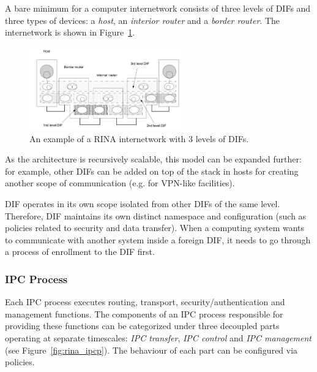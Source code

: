                 A bare minimum for a computer internetwork consists of three levels of DIFs and three types of devices: a \emph{host}, an \emph{interior router} and a \emph{border router}. The internetwork is shown in Figure~\ref{fig:rina_internetwork}.

                \begin{figure}[H]
                    \begin{center}
                        \includegraphics[width=0.6\textwidth]{fig/archs_rina-net.png}
                      \caption{An example of a RINA internetwork with 3 levels of DIFs.}
                      \label{fig:rina_internetwork}
                    \end{center}
                \end{figure}

                As the architecture is recursively scalable, this model can be expanded further: for example, other DIFs can be added on top of the stack in hosts for creating another scope of communication (e.g. for VPN-like facilities).

                DIF operates in its own scope isolated from other DIFs of the same level. Therefore, DIF maintains its own distinct namespace and configuration (such as policies related to security and data transfer). When a computing system wants to communicate with another system inside a foreign DIF, it needs to go through a process of enrollment to the DIF first.

            \subsubsection{IPC Process}

                Each IPC process executes routing, transport, security/authentication and management functions. The components of an IPC process responsible for providing these functions can be categorized under three decoupled parts operating at separate timescales: \emph{IPC transfer}, \emph{IPC control} and \emph{IPC management} (see Figure~\ref{fig:rina_ipcp}). The behaviour of each part can be configured via policies.

